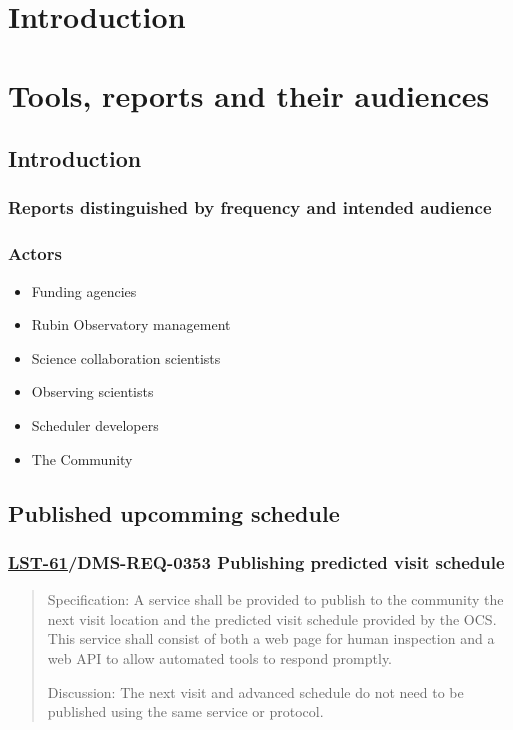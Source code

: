 
\section{Introduction}
\label{sec:org2df4cd2}
\section{Tools, reports and their audiences}
\label{sec:org1244727}
\subsection{Introduction}
\label{sec:org8f7c0e7}
\subsubsection{Reports distinguished by frequency and intended audience}
\label{sec:org4f2efbe}
\subsubsection{Actors}
\label{sec:org0ce905c}
\begin{itemize}
\item Funding agencies
\item Rubin Observatory management
\item Science collaboration scientists
\item Observing scientists
\item Scheduler developers
\item The Community
\end{itemize}
\subsection{Published upcomming schedule}
\label{sec:org233906e}
\subsubsection{\href{https://ls.st/lse-61}{LST-61}/DMS-REQ-0353 Publishing predicted visit schedule}
\label{sec:orgb5b64ac}
\begin{quote}
Specification: A service shall be provided to publish to the community the next visit location and the predicted visit schedule provided by the OCS. This service shall consist of both a web page for human inspection and a web API to allow automated tools to respond promptly.

Discussion: The next visit and advanced schedule do not need to be published using the same service or protocol.
\end{quote}
